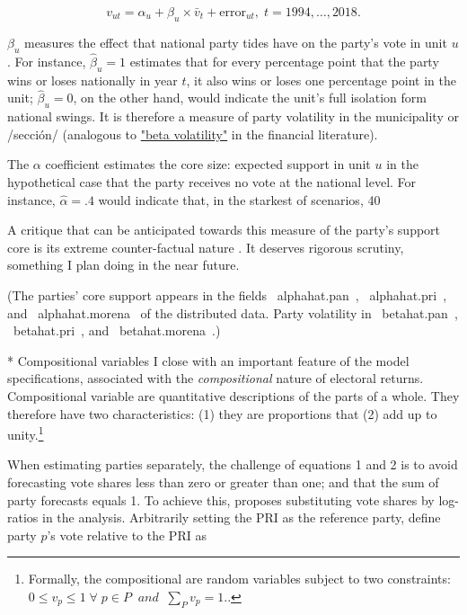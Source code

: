 \documentclass[letter,12pt]{article}
\begin{document}
\begin{equation}
v_{ut} = \alpha_u + \beta_u \times \bar{v}_t + \text{error}_{ut}, \; t = 1994, \ldots, 2018.
\end{equation}\label{alpha-eq}

$\beta_u$ measures the effect that national party tides have on the party's vote in unit $u$. For instance, $\hat{\beta}_u=1$ estimates that for every percentage point that the party wins or loses nationally in year $t$, it also wins or loses one percentage point in the unit; $\hat{\beta}_u=0$, on the other hand, would indicate the unit's full isolation form national swings. It is therefore a measure of party volatility in the municipality or /sección/ (analogous to \href{https://www.investopedia.com/terms/v/volatility.asp}{"beta volatility"} in the financial literature). 

The $\alpha$ coefficient estimates the core size: expected support in unit $u$ in the hypothetical case that the party receives no vote at the national level. For instance, $\hat{\alpha}=.4$ would indicate that, in the starkest of scenarios, 40%

A critique that can be anticipated towards this measure of the party's support core is its extreme counter-factual nature \citep{king.zeng.counterfactuals2006pa}. It deserves rigorous scrutiny, something I plan doing in the near future. 

(The parties' core support appears in the fields ~alphahat.pan~, ~alphahat.pri~, and ~alphahat.morena~ of the distributed data. Party volatility in ~betahat.pan~, ~betahat.pri~, and ~betahat.morena~.)

* Compositional variables
I close with an important feature of the model specifications, associated with the \emph{compositional} nature of electoral returns. Compositional variable are quantitative descriptions of the parts of a whole. They therefore have two characteristics: (1) they are proportions that (2) add up to unity.\footnote{Formally, the compositional are random variables subject to two constraints: 
$0 \leq v_p \leq 1 \; \forall \; p \in P \; \; and \; \; \sum_P v_p = 1.$.} 

When estimating parties separately, the challenge of equations 1 and 2 is to avoid forecasting vote shares less than zero or greater than one; and that the sum of party forecasts equals 1. To achieve this, \citet{aitchison.1986} proposes substituting vote shares by log-ratios in the analysis. Arbitrarily setting the PRI as the reference party, define party $p$'s vote relative to the PRI as 
\end{document}
